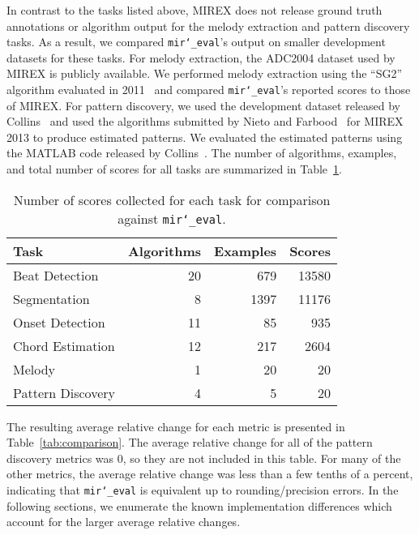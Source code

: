 \documentclass{article}
\def\mireval{\texttt{mir\char`_eval}}
\begin{document}
In contrast to the tasks listed above, MIREX does not release ground truth annotations or algorithm output for the melody extraction and pattern discovery tasks.
As a result, we compared \mireval{}'s output on smaller development datasets for these tasks.
For melody extraction, the ADC2004 dataset used by MIREX is publicly available.
We performed melody extraction using the ``SG2'' algorithm evaluated in 2011~\cite{salamon:MelodyExraction:TASLP:12} and compared \mireval{}'s reported scores to those of MIREX. 
For pattern discovery, we used the development dataset released by
Collins~\cite{Collins2013} and used the algorithms submitted by Nieto and Farbood~\cite{nieto2013discovery} for MIREX 2013 to produce estimated patterns.
We evaluated the estimated patterns using the MATLAB code released by Collins~\cite{Collins2013}.
The number of algorithms, examples, and total number of scores for all tasks are
summarized in Table~\ref{tab:nexamples}.

\begin{table}[htb]
  \centering
\begin{tabularx}{\columnwidth}{l r r r}
\toprule
Task & Algorithms & Examples & Scores\\
\midrule
Beat Detection & 20 & 679 & 13580\\
Segmentation & 8 & 1397 & 11176 \\
Onset Detection & 11 & 85 & 935 \\
Chord Estimation & 12 & 217 & 2604 \\
Melody & 1 & 20 & 20 \\
Pattern Discovery & 4 & 5 & 20 \\
\bottomrule
\end{tabularx}
 \caption{Number of scores collected for each task for comparison against \mireval{}.}
 \label{tab:nexamples}
\end{table}

The resulting average relative change for each metric is presented in Table~\ref{tab:comparison}.
The average relative change for all of the pattern discovery metrics was 0, so they are not included in this table.
For many of the other metrics, the average relative change was less than a few tenths of a percent, indicating that \mireval{} is equivalent up to rounding/precision errors.
In the following sections, we enumerate the known implementation differences which account for the larger average relative changes.
\end{document}
